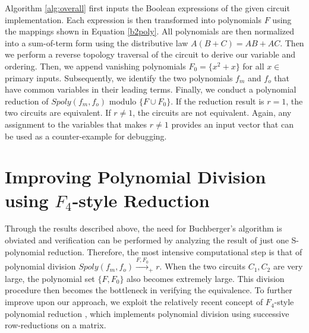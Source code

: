 Algorithm \ref{alg:overall} first inputs the Boolean expressions of
the given circuit implementation. Each expression is then transformed
into polynomials $F$ using the mappings shown in Equation
\ref{b2poly}. All polynomials are then normalized into a sum-of-term
form using the distributive law $A(B+C)=AB+AC$.  
Then we perform a reverse topology traversal of the circuit to
derive our  variable and ordering. Then, we append vanishing
polynomials $F_{0} =\{x^2 + x \}$ for all $x \in$ primary inputs.  
Subsequently, we identify the two polynomials $f_{m}$ and $f_{o}$ that
have common variables in their leading terms. Finally, we conduct a
polynomial reduction of $Spoly(f_{m},f_{o})$  modulo $\{F \cup F_{0}\}$.  
If the reduction result is $r = 1$, the two circuits are equivalent. 
If $r \neq 1$, the circuits are not equivalent. Again, any assignment
to the variables that makes $r \neq 1$ provides an input vector that
can be used as a counter-example for debugging. 

\section{Improving Polynomial Division using $F_4$-style Reduction}

Through the results described above, the need for Buchberger's
algorithm is obviated and verification can be performed by analyzing
the result of just one S-polynomial reduction. Therefore, the most
intensive computational step is that of polynomial division 
$Spoly(f_m,f_o) \stackrel{F,F_0}{\longrightarrow}_+ r$. When the two
circuits $C_1, C_2$ are very large, the polynomial set $\{F, F_0\}$
also becomes extremely large. This division procedure then becomes the
bottleneck in verifying the equivalence. To further improve upon our 
approach, we exploit the relatively recent concept of $F_4$-style
polynomial reduction \cite{f4}, which implements polynomial division
using successive row-reductions on a matrix. 




